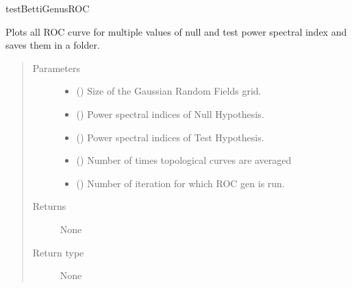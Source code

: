 \documentclass[letterpaper,10pt,english]{sphinxmanual}
\begin{document}
\begin{fulllineitems}
\label{\detokenize{testsFunc:testsFunc.MultitestAllROC}}
\sphinxAtStartPar
testBettiGenusROC

\sphinxAtStartPar
Plots all ROC curve for multiple values of null and test power spectral index and saves them in a folder.
\begin{quote}\begin{description}
\item[{Parameters}] \leavevmode\begin{itemize}
\item {} 
\sphinxAtStartPar
{} () \textendash{} Size of the Gaussian Random Fields grid.

\item {} 
\sphinxAtStartPar
{} () \textendash{} Power spectral indices of Null Hypothesis.

\item {} 
\sphinxAtStartPar
{} () \textendash{} Power spectral indices of Test Hypothesis.

\item {} 
\sphinxAtStartPar
{} () \textendash{} Number of times topological curves are averaged

\item {} 
\sphinxAtStartPar
{} () \textendash{} Number of iteration for which ROC gen is run.

\end{itemize}

\item[{Returns}] \leavevmode
\sphinxAtStartPar
None

\item[{Return type}] \leavevmode
\sphinxAtStartPar
None

\end{description}\end{quote}

\end{fulllineitems}
\end{document}

